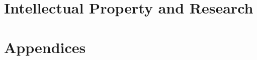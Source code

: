 ﻿\documentclass[11pt,a4paper,oneside]{book}
\theoremstyle{definition}
\theoremstyle{plain}
\theoremstyle{remark}
\theoremstyle{definition}
\begin{document}



\part{Intellectual Property and Research}\label{part:ip}




\appendix
\part{Appendices}\label{part:appendices}








\backmatter




\printindex
\end{document}
